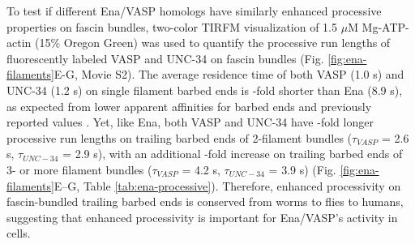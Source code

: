 To test if different Ena/VASP homologs have similarly enhanced processive properties on fascin bundles, two-color TIRFM visualization of 1.5 $\mu$M Mg-ATP-actin (15\% Oregon Green) was used to quantify the processive run lengths of fluorescently labeled VASP and UNC-34 on fascin bundles (Fig. \ref{fig:ena-filaments}E-G, Movie S2). The average residence time of both VASP (1.0 s) and UNC-34 (1.2 s) on single filament barbed ends is -fold shorter than Ena (8.9 s), as expected from lower apparent affinities for barbed ends and previously reported values \citep{hansen_vasp_2010}. Yet, like Ena, both VASP and UNC-34 have -fold longer processive run lengths on trailing barbed ends of 2-filament bundles ($\tau_{VASP}$ = 2.6 s, $\tau_{UNC-34}$ = 2.9 s), with an additional -fold increase on trailing barbed ends of 3- or more filament bundles ($\tau_{VASP}$ = 4.2 s, $\tau_{UNC-34}$ = 3.9 s) (Fig. \ref{fig:ena-filaments}E–G, Table \ref{tab:ena-processive}). Therefore, enhanced processivity on fascin-bundled trailing barbed ends is conserved from worms to flies to humans, suggesting that enhanced processivity is important for Ena/VASP's activity in cells. 

